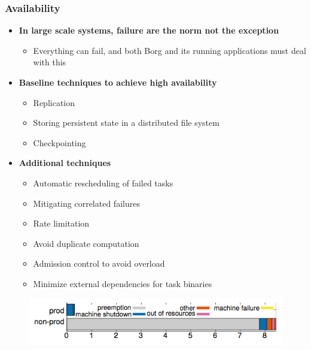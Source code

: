 \begin{frame}
\frametitle{Availability}
\begin{itemize}
	\item {\bf In large scale systems, failure are the norm not the exception}
	\begin{itemize}
		\item Everything can fail, and both Borg and its running applications must deal with this
	\end{itemize}
	\item {\bf Baseline techniques to achieve high availability}
	\begin{itemize}
		\item Replication
		\item Storing persistent state in a distributed file system
		\item Checkpointing
	\end{itemize}
	\item {\bf Additional techniques}
	\begin{itemize}
		\item Automatic rescheduling of failed tasks
		\item Mitigating correlated failures
		\item Rate limitation
		\item Avoid duplicate computation
		\item Admission control to avoid overload
		\item Minimize external dependencies for task binaries
	\end{itemize}
\end{itemize}
\begin{figure}[h]
  \centering
  \includegraphics[scale=0.5]{./figures/borg_eviction_causes}
  \label{fig:borg_eviction_causes}
\end{figure}

\end{frame}

